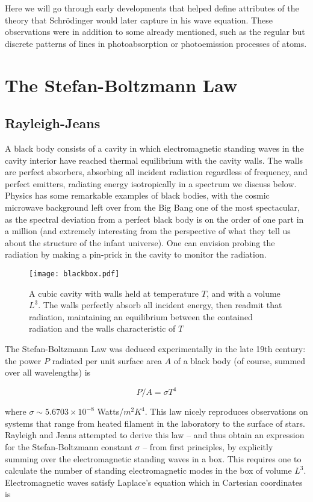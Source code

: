 Here we will go through early developments that helped define attributes of
the theory that Schr\"odinger would later capture in his wave equation. These
observations were in addition to some already mentioned, such as the regular
but discrete patterns of lines in photoabsorption or photoemission processes of
atoms.

\section{The Stefan-Boltzmann Law}
\subsection{Rayleigh-Jeans}

A black body consists of a cavity in which electromagnetic standing waves in
the cavity interior have reached thermal equilibrium with the cavity walls. The
walls are perfect absorbers, absorbing all incident radiation regardless of
frequency, and perfect emitters, radiating energy isotropically in a spectrum
we discuss below. Physics has some remarkable examples of black bodies, with
the cosmic microwave background left over from the Big Bang one of the most
spectacular, as the spectral deviation from a perfect black body is on the
order of one part in a million (and extremely interesting from the perspective
of what they tell us about the structure of the infant universe). One can
envision probing the radiation by making a pin-prick in the cavity to monitor
the radiation. 

\begin{figure}[H]
  \centering
    \texttt{[image: blackbox.pdf]}
    \caption{A cubic cavity with walls held at temperature $T$, and with
      a volume $L^3$. The walls perfectly absorb all incident energy, then
      readmit that radiation, maintaining an equilibrium between the contained
    radiation and the walls characteristic of $T$} 
\end{figure}

The Stefan-Boltzmann Law was deduced experimentally in the late 19th century:
the power $P$ radiated per unit surface area $A$ of a black body (of course,
summed over all wavelengths) is 

\[
  P / A = \sigma T^4
\] \vspace{3px}

where $\sigma \sim 5.6703 \times 10^{-8}$ Watts/$m^2K^4$. This law nicely
reproduces observations on systems that range from heated filament in the
laboratory to the surface of stars. 
Rayleigh and Jeans attempted to derive this law -- and thus obtain an
expression for the Stefan-Boltzmann constant $\sigma$ -- from first principles,
by explicitly summing over the electromagnetic standing waves in a box. This
requires one to calculate the number of standing electromagnetic modes in the
box of volume $L^3$. Electromagnetic waves satisfy Laplace's equation which in
Cartesian coordinates is 


